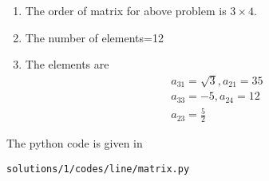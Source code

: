 \begin{enumerate}
\item The order of matrix for above problem is $3\times 4$.
\item The number of elements=12
\item The elements are
\begin{align}
a_{31}=\sqrt{3}
,
a_{21}=35
\\
a_{33}=-5,
a_{24}=12
\\
a_{23}=\frac{5}{2}
\end{align}
\end{enumerate}
The python code is given in 
\begin{lstlisting}
solutions/1/codes/line/matrix.py
\end{lstlisting}
